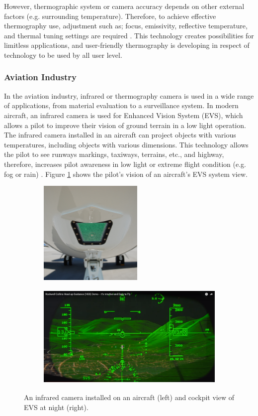 \noindent However, thermographic system or camera accuracy depends on other external factors (e.g. surrounding temperature). Therefore, to achieve effective thermography use, adjustment such as; focus, emissivity, reflective temperature, and thermal tuning settings are required \cite{TroutInfraredPlant}. This technology creates possibilities for limitless applications, and user-friendly thermography is developing in respect of technology to be used by all user level.\\

\subsubsection{Aviation Industry}
In the aviation industry, infrared or thermography camera is used in a wide range of applications, from material evaluation to a surveillance system. In modern aircraft, an infrared camera is used for Enhanced Vision System (EVS), which allows a pilot to improve their vision of ground terrain in a low light operation. The infrared camera installed in an aircraft can project objects with various temperatures, including objects with various dimensions. This technology allows the pilot to see runways markings, taxiways, terrains, etc., and highway, therefore, increases pilot awareness in low light or extreme flight condition (e.g. fog or rain) \cite{Stumper2015ThermalAviation}. Figure \ref{fig:EVS system} shows the pilot's vision of an aircraft's EVS system view.\\

\begin{figure}[!ht]
\centering
%    
  \begin{subfigure}[b]{0.35\textwidth}
    \includegraphics[height=5cm]{Figures/IR_IR camera install.jpg}
  \end{subfigure}
  \begin{subfigure}[b]{0.6\textwidth}
    \includegraphics[height=5cm]{Figures/IR_EVS view.png}
  \end{subfigure}
%  
  \caption{An infrared camera installed on an aircraft \cite{AnonymousEnhancedWikipedia} (left) and cockpit view of EVS at night \cite{FehrmBjornsAnalysis} (right).}
    \label{fig:EVS system}
\end{figure}

